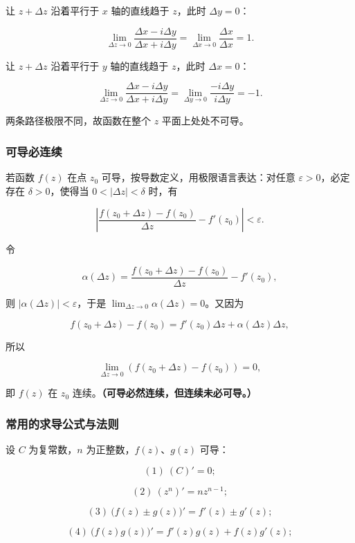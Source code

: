 让 \(z+\Delta z\) 沿着平行于 \(x\) 轴的直线趋于 \(z\)，此时
\(\Delta y=0\)：

\[
\lim_{\Delta z\to0}\frac{\Delta x-i\Delta y}{\Delta x+i\Delta y}
=\lim_{\Delta x\to0}\frac{\Delta x}{\Delta x}=1 .
\]

让 \(z+\Delta z\) 沿着平行于 \(y\) 轴的直线趋于 \(z\)，此时
\(\Delta x=0\)：

\[
\lim_{\Delta z\to0}\frac{\Delta x-i\Delta y}{\Delta x+i\Delta y}
=\lim_{\Delta y\to0}\frac{-i\Delta y}{i\Delta y}=-1 .
\]

两条路径极限不同，故函数在整个 \(z\) 平面上处处不可导。

\subsubsection{可导必连续}\label{ux53efux5bfcux5fc5ux8fdeux7eed}

若函数 \(f(z)\) 在点 \(z_0\) 可导，按导数定义，用极限语言表达：对任意
\(\varepsilon>0\)，必定存在 \(\delta>0\)，使得当 \(0<|\Delta z|<\delta\)
时，有

\[
\left|\frac{f(z_0+\Delta z)-f(z_0)}{\Delta z}-f'(z_0)\right|<\varepsilon .
\]

令

\[
\alpha(\Delta z)=\frac{f(z_0+\Delta z)-f(z_0)}{\Delta z}-f'(z_0),
\]

则 \(|\alpha(\Delta z)|<\varepsilon\)，于是
\(\lim_{\Delta z\to0}\alpha(\Delta z)=0\)。又因为

\[
f(z_0+\Delta z)-f(z_0)=f'(z_0)\Delta z+\alpha(\Delta z)\Delta z,
\]

所以

\[
\lim_{\Delta z\to0}\left(f(z_0+\Delta z)-f(z_0)\right)=0,
\]

即 \(f(z)\) 在 \(z_0\) 连续。\textbf{（可导必然连续，但连续未必可导。）}

\subsubsection{常用的求导公式与法则}\label{ux5e38ux7528ux7684ux6c42ux5bfcux516cux5f0fux4e0eux6cd5ux5219}

设 \(C\) 为复常数，\(n\) 为正整数，\(f(z)\)、\(g(z)\) 可导：

\[
(1)\ (C)'=0;
\]

\[
(2)\ (z^n)'=nz^{n-1};
\]

\[
(3)\ \bigl(f(z)\pm g(z)\bigr)'=f'(z)\pm g'(z);
\]

\[
(4)\ \bigl(f(z)g(z)\bigr)'=f'(z)g(z)+f(z)g'(z);
\]

